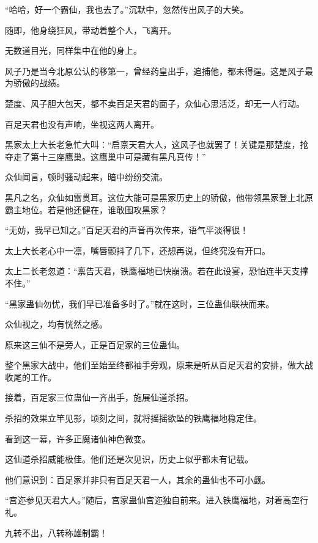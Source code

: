 
\begin{this_body}

“哈哈，好一个霸仙，我也去了。”沉默中，忽然传出风子的大笑。

随即，他身绕狂风，带动着整个人，飞离开。

无数道目光，同样集中在他的身上。

风子乃是当今北原公认的移第一，曾经药皇出手，追捕他，都未得逞。这是风子最为骄傲的战绩。

楚度、风子胆大包天，都不卖百足天君的面子，众仙心思活泛，却无一人行动。

百足天君也没有声响，坐视这两人离开。

黑家太上大长老急忙大叫：“启禀天君大人，这风子也就罢了！关键是那楚度，抢夺走了第十三座鹰巢。这鹰巢中可是藏有黑凡真传！”

众仙闻言，顿时骚动起来，暗中纷纷交流。

黑凡之名，众仙如雷贯耳。这位大能可是黑家历史上的骄傲，他带领黑家登上北原霸主地位。若是他还健在，谁敢围攻黑家？

“无妨，我早已知之。”百足天君的声音再次传来，语气平淡得很！

太上大长老心中一凛，嘴唇颤抖了几下，还想再说，但终究没有开口。

太上二长老忽道：“禀告天君，铁鹰福地已快崩溃。若在此设宴，恐怕连半天支撑不住。”

“黑家蛊仙勿忧，我们早已准备多时了。”就在这时，三位蛊仙联袂而来。

众仙视之，均有恍然之感。

原来这三仙不是旁人，正是百足家的三位蛊仙。

整个黑家大战中，他们至始至终都袖手旁观，原来是听从百足天君的安排，做大战收尾的工作。

接着，百足家三位蛊仙一齐出手，施展仙道杀招。

杀招的效果立竿见影，顷刻之间，就将摇摇欲坠的铁鹰福地稳定住。

看到这一幕，许多正魔诸仙神色微变。

这仙道杀招威能极佳。他们还是次见识，历史上似乎都未有记载。

他们意识到：百足家并非只有百足天君一人，其余的蛊仙也不可小觑。

“宫迩参见天君大人。”随后，宫家蛊仙宫迩独自前来。进入铁鹰福地，对着高空行礼。

九转不出，八转称雄制霸！


\end{this_body}
